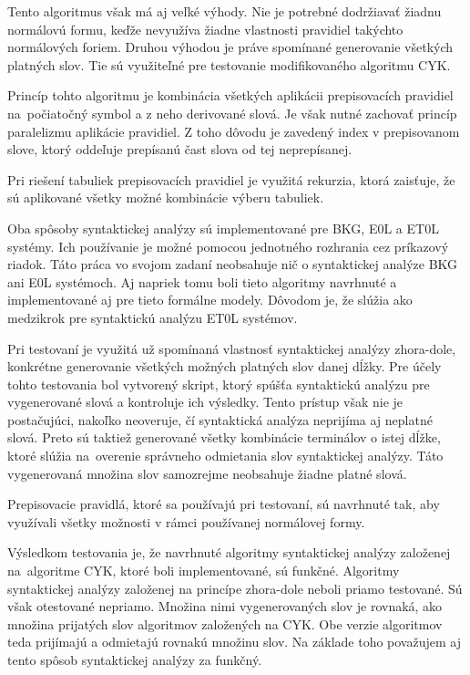 Tento algoritmus však má aj veľké výhody. Nie je potrebné dodržiavať žiadnu normálovú formu, keďže nevyužíva žiadne vlastnosti pravidiel takýchto normálových foriem. Druhou výhodou je práve spomínané generovanie všetkých platných slov. Tie sú využiteľné pre testovanie modifikovaného algoritmu CYK.

Princíp tohto algoritmu je kombinácia všetkých aplikácii prepisovacích pravidiel na~počiatočný symbol a z neho derivované slová. Je však nutné zachovať princíp paralelizmu aplikácie pravidiel. Z toho dôvodu je zavedený index v prepisovanom slove, ktorý oddeľuje prepísanú čast slova od tej neprepísanej.

Pri riešení tabuliek prepisovacích pravidiel je využitá rekurzia, ktorá zaisťuje, že sú aplikované všetky možné kombinácie výberu tabuliek.

Oba spôsoby syntaktickej analýzy sú implementované pre BKG, E0L a ET0L systémy. Ich používanie je možné pomocou jednotného rozhrania cez príkazový riadok. Táto práca vo svojom zadaní neobsahuje nič o syntaktickej analýze BKG ani E0L systémoch. Aj napriek tomu boli tieto algoritmy navrhnuté a implementované aj pre tieto formálne modely. Dôvodom je, že slúžia ako medzikrok pre syntaktickú analýzu ET0L systémov.

Pri testovaní je využitá už spomínaná vlastnosť syntaktickej analýzy zhora-dole, konkrétne generovanie všetkých možných platných slov danej dĺžky. Pre účely tohto testovania bol vytvorený skript, ktorý spúšťa syntaktickú analýzu pre vygenerované slová a kontroluje ich výsledky. Tento prístup však nie je postačujúci, nakoľko neoveruje, čí syntaktická analýza neprijíma aj neplatné slová. Preto sú taktiež generované všetky kombinácie terminálov o istej dĺžke, ktoré slúžia na~overenie správneho odmietania slov syntaktickej analýzy. Táto vygenerovaná množina slov samozrejme neobsahuje žiadne platné slová.

Prepisovacie pravidlá, ktoré sa používajú pri testovaní, sú navrhnuté tak, aby využívali všetky možnosti v rámci používanej normálovej formy.

Výsledkom testovania je, že navrhnuté algoritmy syntaktickej analýzy založenej na~algoritme CYK, ktoré boli implementované, sú funkčné. Algoritmy syntaktickej analýzy založenej na princípe zhora-dole neboli priamo testované. Sú však otestované nepriamo. Množina nimi vygenerovaných slov je rovnaká, ako množina prijatých slov algoritmov založených na CYK. Obe verzie algoritmov teda prijímajú a odmietajú rovnakú množinu slov. Na základe toho považujem aj tento spôsob syntaktickej analýzy za funkčný.

